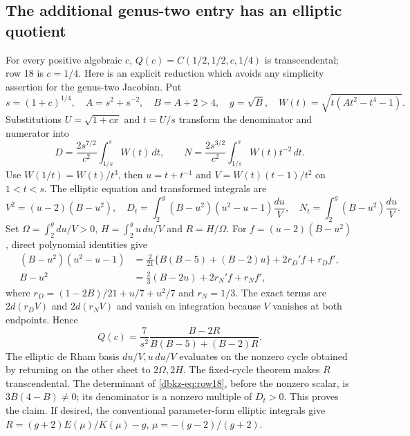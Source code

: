 \documentclass[11pt,a4paper]{article}
\theoremstyle{definition}
\theoremstyle{remark}
\numberwithin{equation}{section}
\begin{document}
\subsection{The additional genus-two entry has an elliptic quotient}
\label{dbkz-sec:row18}
For every positive algebraic $c$, $Q(c)=C(1/2,1/2,c,1/4)$ is
transcendental; row 18 is $c=1/4$. Here is an explicit reduction which
avoids any simplicity assertion for the genus-two Jacobian. Put
\[
 s=(1+c)^{1/4},\quad A=s^2+s^{-2},\quad B=A+2>4,\quad g=\sqrt B,
 \quad W(t)=\sqrt{t(At^2-t^4-1)}.
\]
Substitutions $U=\sqrt{1+cx}$ and $t=U/s$ transform the denominator
and numerator into
\[
 D=\frac{2s^{7/2}}{c^2}\int_{1/s}^sW(t)\,dt,
 \qquad N=\frac{2s^{3/2}}{c^2}\int_{1/s}^sW(t)t^{-2}\,dt.
\]
Use $W(1/t)=W(t)/t^3$, then $u=t+t^{-1}$ and
$V=W(t)(t-1)/t^2$ on $1<t<s$. The elliptic equation and transformed
integrals are
\[
 V^2=(u-2)(B-u^2),\quad
 D_t=\int_2^g(B-u^2)(u^2-u-1)\frac{du}{V},\quad
 N_t=\int_2^g(B-u^2)\frac{du}{V}.
\]
Set $\Omega=\int_2^gdu/V>0$, $H=\int_2^gu\,du/V$ and $R=H/\Omega$.
For $f=(u-2)(B-u^2)$, direct polynomial identities give
\begin{align*}
 (B-u^2)(u^2-u-1)
 &=\tfrac2{21}\{B(B-5)+(B-2)u\}+2r_D'f+r_Df',\\
 B-u^2&=\tfrac23(B-2u)+2r_N'f+r_Nf',
\end{align*}
where $r_D=(1-2B)/21+u/7+u^2/7$ and $r_N=1/3$.
The exact terms are $2d(r_DV)$ and $2d(r_NV)$ and vanish on integration
because $V$ vanishes at both endpoints. Hence
\begin{equation}\label{dbkz-eq:row18}
 Q(c)=\frac7{s^2}\frac{B-2R}{B(B-5)+(B-2)R}.
\end{equation}
The elliptic de Rham basis $du/V,u\,du/V$ evaluates on the nonzero
cycle obtained by returning on the other sheet to $2\Omega,2H$.
The fixed-cycle theorem makes $R$ transcendental. The determinant of
\eqref{dbkz-eq:row18}, before the nonzero scalar, is $3B(4-B)\ne0$;
its denominator is a nonzero multiple of $D_t>0$. This proves the claim.
If desired, the conventional parameter-form elliptic integrals give
$R=(g+2)E(\mu)/K(\mu)-g$, $\mu=-(g-2)/(g+2)$.
\end{document}
